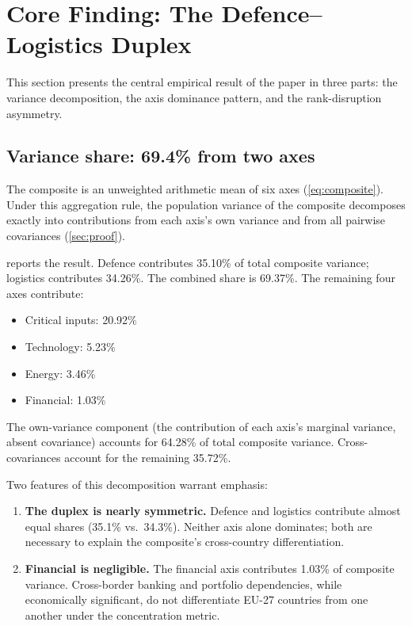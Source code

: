 \section{Core Finding: The Defence--Logistics Duplex}%
\label{sec:core-finding}

This section presents the central empirical result of the paper in
three parts: the variance decomposition, the axis dominance pattern,
and the rank-disruption asymmetry.

\subsection{Variance share: 69.4\% from two axes}

The {\ISI} composite is an unweighted arithmetic mean of six axes
(\cref{eq:composite}).  Under this aggregation rule, the population
variance of the composite decomposes exactly into contributions from
each axis's own variance and from all pairwise covariances
(\cref{sec:proof}).

 reports the result.  Defence contributes
35.10\% of total composite variance; logistics contributes 34.26\%.
The combined share is 69.37\%.  The remaining four axes
contribute:

\begin{itemize}[leftmargin=2em]
  \item Critical inputs: 20.92\%
  \item Technology: 5.23\%
  \item Energy: 3.46\%
  \item Financial: 1.03\%
\end{itemize}

\noindent
The own-variance component (the contribution of each axis's marginal
variance, absent covariance) accounts for 64.28\% of total composite
variance.  Cross-covariances account for the remaining 35.72\%.

Two features of this decomposition warrant emphasis:

\begin{enumerate}[leftmargin=2em]
  \item \textbf{The duplex is nearly symmetric.}  Defence and
    logistics contribute almost equal shares (35.1\% vs.\ 34.3\%).
    Neither axis alone dominates; both are necessary to explain the
    composite's cross-country differentiation.

  \item \textbf{Financial is negligible.}  The financial axis
    contributes 1.03\% of composite variance.  Cross-border banking
    and portfolio dependencies, while economically significant, do not
    differentiate EU-27 countries from one another under the {\HHI}
    concentration metric.
\end{enumerate}

